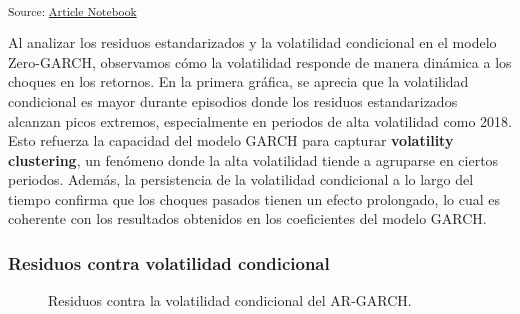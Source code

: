 \documentclass[
  number,
  preprint,
  3p,
  onecolumn]{elsarticle}
\begin{document}
\textsubscript{Source:
\href{https://iancont.github.io/fixed_income_garch/index.qmd.html}{Article
Notebook}}

Al analizar los residuos estandarizados y la volatilidad condicional en
el modelo Zero-GARCH, observamos cómo la volatilidad responde de manera
dinámica a los choques en los retornos. En la primera gráfica, se
aprecia que la volatilidad condicional es mayor durante episodios donde
los residuos estandarizados alcanzan picos extremos, especialmente en
periodos de alta volatilidad como 2018. Esto refuerza la capacidad del
modelo GARCH para capturar \textbf{volatility clustering}, un fenómeno
donde la alta volatilidad tiende a agruparse en ciertos periodos.
Además, la persistencia de la volatilidad condicional a lo largo del
tiempo confirma que los choques pasados tienen un efecto prolongado, lo
cual es coherente con los resultados obtenidos en los coeficientes del
modelo GARCH.

\subsubsection{Residuos contra volatilidad
condicional}\label{residuos-contra-volatilidad-condicional}

\begin{figure}[H]


\caption{\label{fig-residuals-vs-volatility}Residuos contra la
volatilidad condicional del AR-GARCH.}

\end{figure}%
\end{document}
